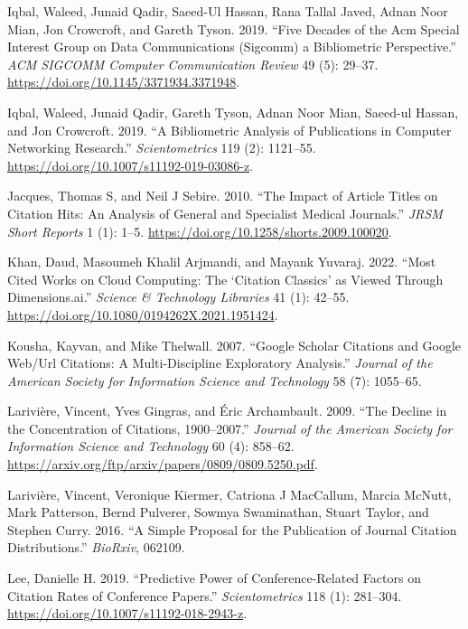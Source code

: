 \documentclass{article}
\begin{document}
\leavevmode\hypertarget{ref-iqbal19:sigcomm}{}%
Iqbal, Waleed, Junaid Qadir, Saeed-Ul Hassan, Rana Tallal Javed, Adnan Noor Mian, Jon Crowcroft, and Gareth Tyson. 2019. ``Five Decades of the Acm Special Interest Group on Data Communications (Sigcomm) a Bibliometric Perspective.'' \emph{ACM SIGCOMM Computer Communication Review} 49 (5): 29--37. \url{https://doi.org/10.1145/3371934.3371948}.

\leavevmode\hypertarget{ref-iqbal19:bibliometric}{}%
Iqbal, Waleed, Junaid Qadir, Gareth Tyson, Adnan Noor Mian, Saeed-ul Hassan, and Jon Crowcroft. 2019. ``A Bibliometric Analysis of Publications in Computer Networking Research.'' \emph{Scientometrics} 119 (2): 1121--55. \url{https://doi.org/10.1007/s11192-019-03086-z}.

\leavevmode\hypertarget{ref-jacques10:impact}{}%
Jacques, Thomas S, and Neil J Sebire. 2010. ``The Impact of Article Titles on Citation Hits: An Analysis of General and Specialist Medical Journals.'' \emph{JRSM Short Reports} 1 (1): 1--5. \url{https://doi.org/10.1258/shorts.2009.100020}.

\leavevmode\hypertarget{ref-khan22:cloud}{}%
Khan, Daud, Masoumeh Khalil Arjmandi, and Mayank Yuvaraj. 2022. ``Most Cited Works on Cloud Computing: The `Citation Classics' as Viewed Through Dimensions.ai.'' \emph{Science \& Technology Libraries} 41 (1): 42--55. \url{https://doi.org/10.1080/0194262X.2021.1951424}.

\leavevmode\hypertarget{ref-kousha07:google}{}%
Kousha, Kayvan, and Mike Thelwall. 2007. ``Google Scholar Citations and Google Web/Url Citations: A Multi-Discipline Exploratory Analysis.'' \emph{Journal of the American Society for Information Science and Technology} 58 (7): 1055--65.

\leavevmode\hypertarget{ref-lariviere09:decline}{}%
Larivière, Vincent, Yves Gingras, and Éric Archambault. 2009. ``The Decline in the Concentration of Citations, 1900--2007.'' \emph{Journal of the American Society for Information Science and Technology} 60 (4): 858--62. \url{https://arxiv.org/ftp/arxiv/papers/0809/0809.5250.pdf}.

\leavevmode\hypertarget{ref-lariviere16:simple}{}%
Larivière, Vincent, Veronique Kiermer, Catriona J MacCallum, Marcia McNutt, Mark Patterson, Bernd Pulverer, Sowmya Swaminathan, Stuart Taylor, and Stephen Curry. 2016. ``A Simple Proposal for the Publication of Journal Citation Distributions.'' \emph{BioRxiv}, 062109.

\leavevmode\hypertarget{ref-lee19:predictive}{}%
Lee, Danielle H. 2019. ``Predictive Power of Conference-Related Factors on Citation Rates of Conference Papers.'' \emph{Scientometrics} 118 (1): 281--304. \url{https://doi.org/10.1007/s11192-018-2943-z}.
\end{document}
